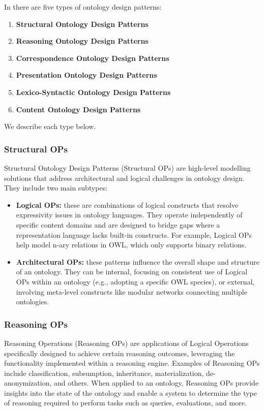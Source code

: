 In \cite{falbo2013ontology} there are five types of ontology design patterns:
\begin{enumerate}
    \item \textbf{Structural Ontology Design Patterns}

    \item \textbf{Reasoning Ontology Design Patterns}

    \item \textbf{Correspondence Ontology Design Patterns}

    \item \textbf{Presentation Ontology Design Patterns}

    \item \textbf{Lexico-Syntactic Ontology Design Patterns}

    \item \textbf{Content Ontology Design Patterns}
\end{enumerate}
We describe each type below.

\subsubsection{Structural OPs}
Structural Ontology Design Patterns (Structural OPs) are high-level modelling solutions that address architectural and logical challenges in ontology design.
They include two main subtypes:
\begin{itemize}
    \item \textbf{Logical OPs:} these are combinations of logical constructs that resolve expressivity issues in ontology languages. They operate independently of specific content domains and are designed to bridge gaps where a representation language lacks built-in constructs. For example, Logical OPs help model n-ary relations in OWL, which only supports binary relations.

    \item \textbf{Architectural OPs:} these patterns influence the overall shape and structure of an ontology. They can be internal, focusing on consistent use of Logical OPs within an ontology (e.g., adopting a specific OWL species), or external, involving meta-level constructs like modular networks connecting multiple ontologies.
\end{itemize}


\subsubsection{Reasoning OPs}
Reasoning Operations (Reasoning OPs) are applications of Logical Operations specifically designed to achieve certain reasoning outcomes, leveraging the functionality implemented within a reasoning engine. Examples of Reasoning OPs include classification, subsumption, inheritance, materialization, de-anonymization, and others. When applied to an ontology, Reasoning OPs provide insights into the state of the ontology and enable a system to determine the type of reasoning required to perform tasks such as queries, evaluations, and more. 

